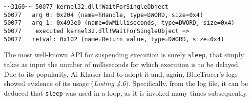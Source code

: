 \vspace{0.5cm}
\begin{lstlisting}[caption={Log entry relative to \texttt{WaitForSingleObject}},captionpos=b]
~~3160~~ 50077 kernel32.dll!WaitForSingleObject
50077 	arg 0: 0x204 (name=hHandle, type=DWORD, size=0x4)
50077 	arg 1: 0x493e0 (name=dwMilliseconds, type=DWORD, size=0x4)
50077    executed kernel32.dll!WaitForSingleObject =>
50077 	retval: 0x102 (name=Return value, type=DWORD, size=0x4)
\end{lstlisting}

The most well-known API for suspending execution is surely \texttt{sleep}, that simply takes as input the number of milliseconds for which execution is to be delayed. Due to its popularity, Al-Khaser had to adopt it and, again, BlueTracer's logs showed evidence of its usage (\textit{Listing 4.6}). Specifically, from the log file, it can be deduced that \texttt{sleep} was used in a loop, as it is invoked many times subsequently.

